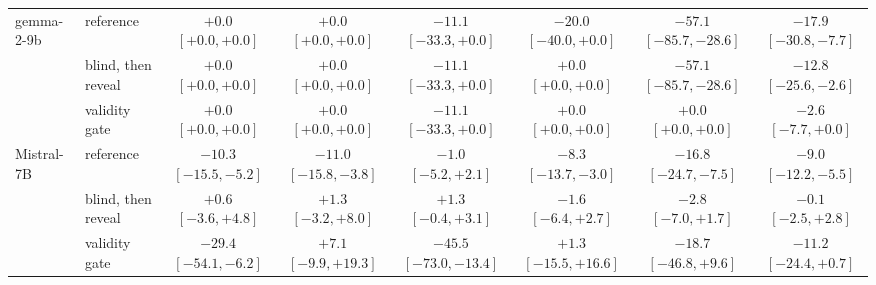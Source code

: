 \begin{tabular}{llcccccc}
\addlinespace
gemma-2-9b & reference & $+0.0$ {\scriptsize$[+0.0,+0.0]$} & $+0.0$ {\scriptsize$[+0.0,+0.0]$} & $-11.1$ {\scriptsize$[-33.3,+0.0]$} & $-20.0$ {\scriptsize$[-40.0,+0.0]$} & $-57.1$ {\scriptsize$[-85.7,-28.6]$} & $-17.9$ {\scriptsize$[-30.8,-7.7]$} \\
 & blind, then reveal & $+0.0$ {\scriptsize$[+0.0,+0.0]$} & $+0.0$ {\scriptsize$[+0.0,+0.0]$} & $-11.1$ {\scriptsize$[-33.3,+0.0]$} & $+0.0$ {\scriptsize$[+0.0,+0.0]$} & $-57.1$ {\scriptsize$[-85.7,-28.6]$} & $-12.8$ {\scriptsize$[-25.6,-2.6]$} \\
 & validity gate & $+0.0$ {\scriptsize$[+0.0,+0.0]$} & $+0.0$ {\scriptsize$[+0.0,+0.0]$} & $-11.1$ {\scriptsize$[-33.3,+0.0]$} & $+0.0$ {\scriptsize$[+0.0,+0.0]$} & $+0.0$ {\scriptsize$[+0.0,+0.0]$} & $-2.6$ {\scriptsize$[-7.7,+0.0]$} \\
\addlinespace
Mistral-7B & reference & $-10.3$ {\scriptsize$[-15.5,-5.2]$} & $-11.0$ {\scriptsize$[-15.8,-3.8]$} & $-1.0$ {\scriptsize$[-5.2,+2.1]$} & $-8.3$ {\scriptsize$[-13.7,-3.0]$} & $-16.8$ {\scriptsize$[-24.7,-7.5]$} & $-9.0$ {\scriptsize$[-12.2,-5.5]$} \\
 & blind, then reveal & $+0.6$ {\scriptsize$[-3.6,+4.8]$} & $+1.3$ {\scriptsize$[-3.2,+8.0]$} & $+1.3$ {\scriptsize$[-0.4,+3.1]$} & $-1.6$ {\scriptsize$[-6.4,+2.7]$} & $-2.8$ {\scriptsize$[-7.0,+1.7]$} & $-0.1$ {\scriptsize$[-2.5,+2.8]$} \\
 & validity gate & $-29.4$ {\scriptsize$[-54.1,-6.2]$} & $+7.1$ {\scriptsize$[-9.9,+19.3]$} & $-45.5$ {\scriptsize$[-73.0,-13.4]$} & $+1.3$ {\scriptsize$[-15.5,+16.6]$} & $-18.7$ {\scriptsize$[-46.8,+9.6]$} & $-11.2$ {\scriptsize$[-24.4,+0.7]$} \\
\bottomrule
\end{tabular}
